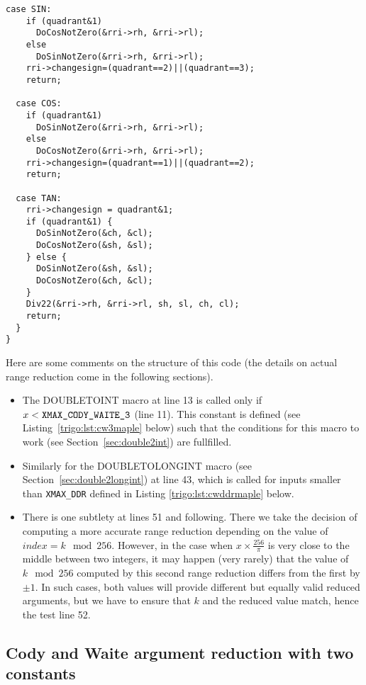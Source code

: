 \begin{lstlisting}[caption={Multilevel argument reduction \label{lst:trig:argred}},firstnumber=1]
  case SIN: 
    if (quadrant&1)   
      DoCosNotZero(&rri->rh, &rri->rl);
    else 
      DoSinNotZero(&rri->rh, &rri->rl);
    rri->changesign=(quadrant==2)||(quadrant==3);
    return;

  case COS: 
    if (quadrant&1)   
      DoSinNotZero(&rri->rh, &rri->rl);
    else 
      DoCosNotZero(&rri->rh, &rri->rl);
    rri->changesign=(quadrant==1)||(quadrant==2);
    return;

  case TAN: 
    rri->changesign = quadrant&1;
    if (quadrant&1) {
      DoSinNotZero(&ch, &cl);
      DoCosNotZero(&sh, &sl);
    } else {
      DoSinNotZero(&sh, &sl);
      DoCosNotZero(&ch, &cl);
    }
    Div22(&rri->rh, &rri->rl, sh, sl, ch, cl);
    return;
  }
}
\end{lstlisting}
 

Here are some comments on the structure of this code (the details on
actual range reduction come in the following sections).

\begin{itemize}
\item The DOUBLETOINT macro at line 13 is called only if
  $x<\verb!XMAX_CODY_WAITE_3!$ (line 11). This constant is defined  (see
  Listing~\ref{trigo:lst:cw3maple} below) such
  that the conditions for this macro to work (see
  Section~\ref{sec:double2int}) are fullfilled. 

\item Similarly for the DOUBLETOLONGINT macro (see
  Section~\ref{sec:double2longint}) at line 43, which is called for
  inputs smaller than \verb!XMAX_DDR! defined in Listing
  \ref{trigo:lst:cwddrmaple} below.

\item There is one subtlety at lines 51 and following. There we take
  the decision of computing a more accurate range reduction depending
  on the value of $\mathit{index}=k\mod 256$. However, in the case
  when $x\times\frac{256}{\pi}$ is very close to the middle between
  two integers, it may happen (very rarely) that the value of $k\mod
  256$ computed by this second range reduction differs from the first
  by $\pm 1$. In such cases, both values will provide different but
  equally valid reduced arguments, but we have to ensure that $k$ and
  the reduced value match, hence the test line 52.
\end{itemize}



\subsection{Cody and Waite argument reduction with two constants}

